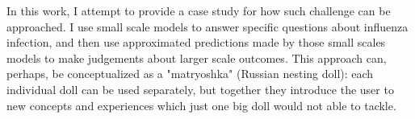 In this work, I attempt to provide a case study for how such challenge can be approached. I use small scale models to answer specific questions about influenza infection, and then use approximated predictions made by those small scales models to make judgements about larger scale outcomes. This approach can, perhaps, be conceptualized as a "matryoshka" (Russian nesting doll): each individual doll can be used separately, but together they introduce the user to new concepts and experiences which just one big doll would not able to tackle.











